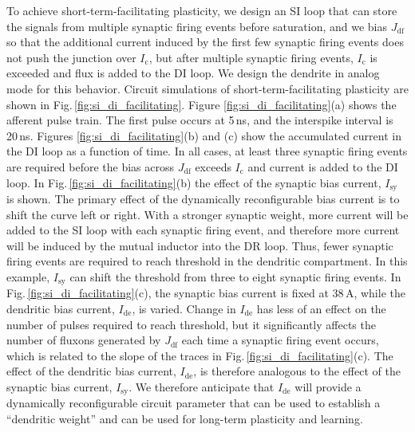 \documentclass[twocolumn]{article}
\begin{document}
To achieve short-term-facilitating plasticity, we design an SI loop that can store the signals from multiple synaptic firing events before saturation, and we bias $J_{\mathrm{df}}$ so that the additional current induced by the first few synaptic firing events does not push the junction over $I_{\mathrm{c}}$, but after multiple synaptic firing events, $I_{\mathrm{c}}$ is exceeded and flux is added to the DI loop. We design the dendrite in analog mode for this behavior. Circuit simulations of short-term-facilitating plasticity are shown in Fig.\,\ref{fig:si_di_facilitating}. Figure \ref{fig:si_di_facilitating}(a) shows the afferent pulse train. The first pulse occurs at 5\,ns, and the interspike interval is 20\,ns. Figures \ref{fig:si_di_facilitating}(b) and (c) show the accumulated current in the DI loop as a function of time. In all cases, at least three synaptic firing events are required before the bias across $J_{\mathrm{df}}$ exceeds $I_{\mathrm{c}}$ and current is added to the DI loop. In Fig.\,\ref{fig:si_di_facilitating}(b) the effect of the synaptic bias current, $I_{\mathrm{sy}}$ is shown. The primary effect of the dynamically reconfigurable bias current is to shift the curve left or right. With a stronger synaptic weight, more current will be added to the SI loop with each synaptic firing event, and therefore more current will be induced by the mutual inductor into the DR loop. Thus, fewer synaptic firing events are required to reach threshold in the dendritic compartment. In this example, $I_{\mathrm{sy}}$ can shift the threshold from three to eight synaptic firing events. In Fig.\,\ref{fig:si_di_facilitating}(c), the synaptic bias current is fixed at 38\,\textmu A, while the dendritic bias current, $I_{\mathrm{de}}$, is varied. Change in $I_{\mathrm{de}}$ has less of an effect on the number of pulses required to reach threshold, but it significantly affects the number of fluxons generated by $J_{\mathrm{df}}$ each time a synaptic firing event occurs, which is related to the slope of the traces in Fig.\,\ref{fig:si_di_facilitating}(c). The effect of the dendritic bias current, $I_{\mathrm{de}}$, is therefore analogous to the effect of the synaptic bias current, $I_{\mathrm{sy}}$. We therefore anticipate that $I_{\mathrm{de}}$ will provide a dynamically reconfigurable circuit parameter that can be used to establish a ``dendritic weight'' and can be used for long-term plasticity and learning. 
\end{document}
